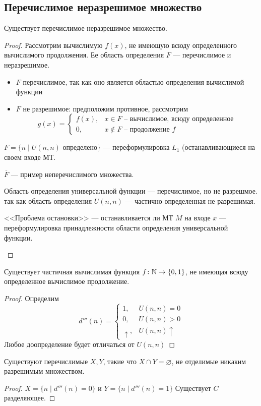 \subsection{Перечислимое неразрешимое множество}
\begin{thm}
    Существует перечислимое неразрешимое множество.
\end{thm}
\begin{proof}
	Рассмотрим вычислимую $ f(x)$, не имеющую всюду определенного вычислимого продолжения. Ее область определения $ F$ --- перечислимое и неразрешимое.
	\begin{itemize}
		\item $ F$ перечислимое, так как оно является областью определения вычислимой функции
		\item $ F$ не разрешимое: предположим противное,
			рассмотрим 
			 \[
				 g(x) = \begin{cases}
					 f(x), & x \in F \text{ -- вычислимое, всюду определенное} \\
					 0, & x \notin F \text{ -- продолжение } f
				 \end{cases}
			\] 
	\end{itemize}
\begin{note}
	$ F = \{n \mid U(n, n) \text{ определено}\}$ --- переформулировка $ L_1$ (останавливающиеся на своем входе МТ.
\end{note}
\begin{note}
    $ \overline{F}$ --- пример неперечислимого множества.
\end{note}
\begin{note}
    Область определения универсальной функции --- перечислимое, но не разрешмое. 
	так как область определения $ U(n, n)$ --- частично определенная не разрешимая.
\end{note}
\begin{note}
    <<Проблема остановки>> --- останавливается ли МТ $ M$ на входе $ x$ --- переформулировка принадлежности области определения универсальной функции.
\end{note}
\end{proof}


\begin{thm}
    Существует частичная вычислимая функция $ f\colon  \mathbb{N} \to  \{0, 1\}$, не имеющая всюду определенное вычислимое продолжение.
\end{thm}
\begin{proof}
    Определим
	\[
		d'''(n) = \begin{cases}
		1, & U(n, n) = 0 \\
		0, & U(n, n) > 0 \\
		\uparrow, & U(n, n) \uparrow
	\end{cases}
	\] 
	Любое доопределение будет отличаться от $ U(n, n)$
\end{proof}

\begin{cor}
    Существуют перечислимые $ X, Y$, такие что $ X  \cap Y = \varnothing$, не отделимые никаким разрешимым множеством. 
\end{cor}
\begin{proof}
	$ X = \{ n \mid d'''(n) = 0\}$ и  $ Y = \{n \mid d'''(n) =1 \}$
Существует $ C$ разделяющее.
\end{proof}

